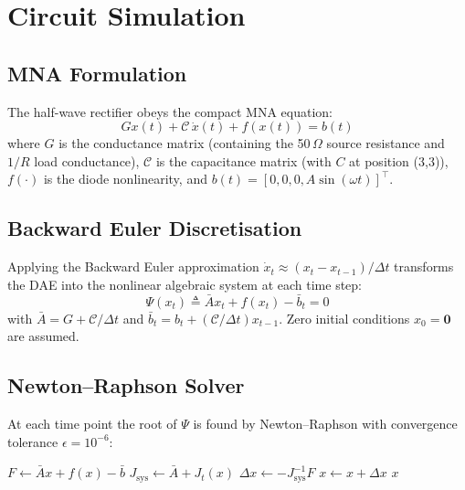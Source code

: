 \documentclass[journal,twocolumn]{IEEEtran}
\begin{document}
\section{Circuit Simulation}
\label{sec:sim}

\subsection{MNA Formulation}

The half-wave rectifier obeys the compact MNA equation:
\begin{equation}
Gx(t) + \mathcal{C}\,\dot{x}(t) + f(x(t)) = b(t)
\end{equation}
where $G$ is the conductance matrix (containing the 50\,$\Omega$ source resistance and $1/R$ load conductance), $\mathcal{C}$ is the capacitance matrix (with $C$ at position (3,3)), $f(\cdot)$ is the diode nonlinearity, and $b(t) = [0,0,0,A\sin(\omega t)]^\top$.

\subsection{Backward Euler Discretisation}

Applying the Backward Euler approximation $\dot{x}_t \approx (x_t - x_{t-1})/\Delta t$ transforms the DAE into the nonlinear algebraic system at each time step:
\begin{equation}
\Psi(x_t) \triangleq \bar{A}x_t + f(x_t) - \bar{b}_t = 0
\end{equation}
with $\bar{A} = G + \mathcal{C}/\Delta t$ and $\bar{b}_t = b_t + (\mathcal{C}/\Delta t)x_{t-1}$. Zero initial conditions $x_0 = \mathbf{0}$ are assumed.

\subsection{Newton--Raphson Solver}

At each time point the root of $\Psi$ is found by Newton--Raphson with convergence tolerance $\epsilon = 10^{-6}$:

\begin{algorithm}[H]
\caption{Newton--Raphson}
\begin{algorithmic}[1]
    \State $F \leftarrow \bar{A}x + f(x) - \bar{b}$
    \State $J_{\text{sys}} \leftarrow \bar{A} + J_t(x)$ 
    \State $\Delta x \leftarrow -J_{\text{sys}}^{-1} F$
    \State $x \leftarrow x + \Delta x$
  \EndWhile
  \State \Return $x$
\EndProcedure
\end{algorithmic}
\end{algorithm}
\end{document}

